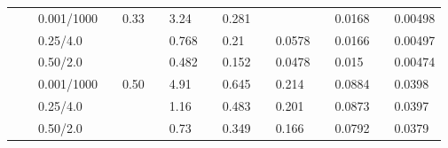 \begin{table}
\begin{tabular}{*{15}{l}}
    && 0.001/1000 &&
    \multirow{3}{*}{0.33} &&
	3.24 && 0.281 && \dmscf{0.0615} && 0.0168 && 0.00498
    \\
    && 0.25/4.0 &&
    &&
	0.768 && 0.21 && 0.0578 && 0.0166 && 0.00497
    \\
    && 0.50/2.0 &&
    &&
	0.482 && 0.152 && 0.0478 && 0.015 && 0.00474
    \\
    \cline{2-15}
    
    && 0.001/1000 &&
    \multirow{3}{*}{0.50} &&
	4.91 && 0.645 && 0.214 && 0.0884 && 0.0398
    \\
    && 0.25/4.0 &&
    &&
	1.16 && 0.483 && 0.201 && 0.0873 && 0.0397
    \\
    && 0.50/2.0 &&
    &&
	0.73 && 0.349 && 0.166 && 0.0792 && 0.0379
    \\
    \cline{2-15}

    \hline\bottomrule
  \end{tabular}
\end{table}
